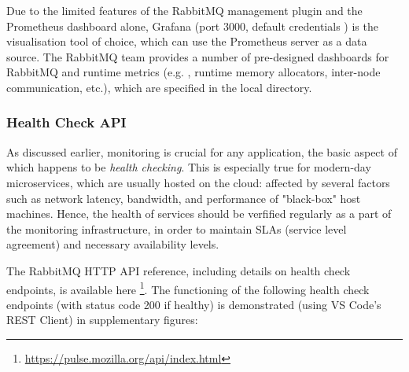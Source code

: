 Due to the limited features of the RabbitMQ management plugin and the Prometheus dashboard alone, Grafana (port 3000, default credentials ) is the visualisation tool of choice, which can use the Prometheus server as a data source. The RabbitMQ team provides a number of pre-designed dashboards for RabbitMQ and runtime metrics (e.g. , runtime memory allocators, inter-node communication, etc.), which are specified in the local  directory.


\subsubsection{Health Check API}

As discussed earlier, monitoring is crucial for any application, the basic aspect of which happens to be \textit{health checking}. This is especially true for modern-day microservices, which are usually hosted on the cloud: affected by several factors such as network latency, bandwidth, and performance of "black-box" host machines. Hence, the health of services should be verfified regularly as a part of the monitoring infrastructure, in order to maintain SLAs (service level agreement) and necessary availability levels.

The RabbitMQ HTTP API reference, including details on health check endpoints, is available here \footnote{\url{https://pulse.mozilla.org/api/index.html}}. The functioning of the following health check endpoints (with status code 200 if healthy) is demonstrated (using VS Code's REST Client) in supplementary figures:

